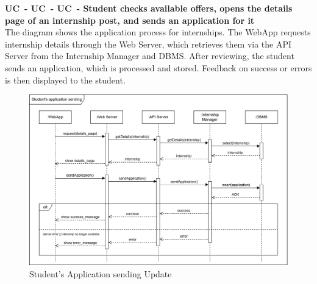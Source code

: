 \textbf{UC\cuc\ - UC\cuc\ - UC\cuc\  - Student checks available offers, opens the details page of an internship post, and sends an application for it} \\
The diagram shows the application process for internships. The WebApp requests internship details through the Web Server, which retrieves them via the API Server from the Internship Manager and DBMS. After reviewing, the student sends an application, which is processed and stored. Feedback on success or errors is then displayed to the student.
\begin{center}
    \begin{figure}[H]
        \centering
        \includegraphics[width=1\linewidth]{Images/Sequence diagrams/UC567.png}
        \caption{Student's Application sending Update}
        \label{fig:enter-label}
    \end{figure}
\end{center}

